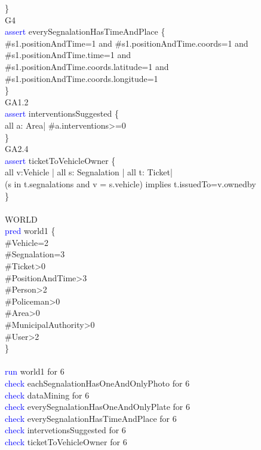 \}\\
G4\\
\textcolor{blue}{assert}
\textcolor{mycolor}{everySegnalationHasTimeAndPlace} \{\\
\#s1.positionAndTime=1 and \#s1.positionAndTime.coords=1 and \#s1.positionAndTime.time=1 and\\ 
\#s1.positionAndTime.coords.latitude=1 and \#s1.positionAndTime.coords.longitude=1\\
\}\\
GA1.2\\
\textcolor{blue}{assert}
\textcolor{mycolor}{interventionsSuggested} \{\\
all a: Area| \#a.interventions>=0\\
\}\\
GA2.4\\
\textcolor{blue}{assert}
\textcolor{mycolor}{ticketToVehicleOwner} \{\\
all v:Vehicle | all s: Segnalation | all t: Ticket|\\
(s in t.segnalations and v = s.vehicle) implies t.issuedTo=v.ownedby\\
\}\\
\\
WORLD\\
\textcolor{blue}{pred}
\textcolor{mycolor}{world1} \{\\
\#Vehicle=2\\
\#Segnalation=3\\
\#Ticket>0\\
\#PositionAndTime>3\\
\#Person>2\\
\#Policeman>0\\
\#Area>0\\
\#MunicipalAuthority>0\\
\#User>2\\
\}\\
\\
\textcolor{blue}{run} world1 for 6\\
\textcolor{blue}{check}
\textcolor{mycolor}{eachSegnalationHasOneAndOnlyPhoto} for 6\\
\textcolor{blue}{check}
\textcolor{mycolor}{dataMining} for 6\\
\textcolor{blue}{check}
\textcolor{mycolor}{everySegnalationHasOneAndOnlyPlate} for 6\\
\textcolor{blue}{check}
\textcolor{mycolor}{everySegnalationHasTimeAndPlace} for 6\\
\textcolor{blue}{check}
\textcolor{mycolor}{intervetionsSuggested} for 6\\
\textcolor{blue}{check}
\textcolor{mycolor}{ticketToVehicleOwner} for 6\\